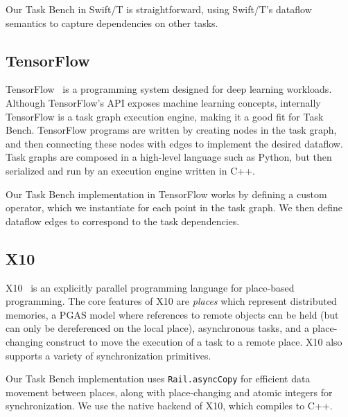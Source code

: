 Our Task Bench in Swift/T is straightforward, using Swift/T's dataflow
semantics to capture dependencies on other tasks.

\subsection{TensorFlow}

TensorFlow~\cite{TensorFlow15} is a programming system designed for
deep learning workloads. Although TensorFlow's API exposes
machine learning concepts, internally TensorFlow is a task graph execution engine, making it a good fit for
Task Bench. TensorFlow programs are written by creating nodes in the
task graph, and then connecting these nodes with edges to implement
the desired dataflow. Task graphs are composed in a high-level
language such as Python, but then serialized and run by an
execution engine written in C++.

Our Task Bench implementation in TensorFlow works by defining a custom
operator, which we instantiate for each point in the task graph. We
then define dataflow edges to correspond to the task dependencies.

\subsection{X10}

X10~\cite{X1005} is an explicitly parallel programming language for
place-based programming. The core features of X10 are \emph{places}
which represent distributed memories, a PGAS model where references to
remote objects can be held (but can only be dereferenced on the local
place), asynchronous tasks, and a place-changing construct to move the
execution of a task to a remote place. X10 also supports a variety of
synchronization primitives.

Our Task Bench implementation uses
\lstinline[language=X10]{Rail.asyncCopy} for efficient data movement
between places, along with place-changing and atomic integers for
synchronization. We use the native backend of X10, which compiles to
C++.

